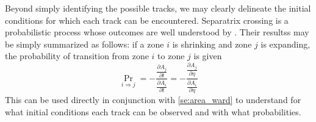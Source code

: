 \documentclass[
        fleqn,
        usenatbib,
    ]{mnras}
\newcommand*{\pd}[2]{\frac{\partial#1}{\partial#2}}
\begin{document}
Beyond simply identifying the possible tracks, we may clearly delineate the
initial conditions for which each track can be encountered. Separatrix crossing
is a probabilistic process whose outcomes are well understood by
\citealp{henrard1982,henrard1987}. Their resultss may be simply summarized as
follows: if a zone $i$ is shrinking and zone $j$ is expanding, the probability
of transition from zone $i$ to zone $j$ is given
\begin{equation}
    \Pr_{i \Rightarrow j} = -\frac{\pd{A_j}{t}}{ \pd{A_i}{t}}
        = -\frac{\pd{A_j}{\eta}}{ \pd{A_i}{\eta}}\label{eq:henrard_hop}
\end{equation}
This can be used directly in conjunction with \autoref{se:area_ward} to
understand for what initial conditions each track can be observed and with what
probabilities.
\end{document}
